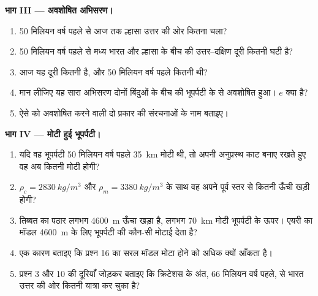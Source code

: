 \begin{problem}[{सप्ताहांत समस्या --- भारत की यात्रा}]
\medskip
\noindent\textbf{भाग III --- अवशोषित अभिसरण।}
\begin{enumerate}[resume]
  \item 50 मिलियन वर्ष पहले से आज तक ल्हासा उत्तर की ओर कितना चला?
  \item 50 मिलियन वर्ष पहले से मध्य भारत और ल्हासा के बीच की
        उत्तर--दक्षिण दूरी कितनी घटी है?
  \item आज यह दूरी कितनी है, और 50 मिलियन वर्ष पहले कितनी थी?
  \item मान लीजिए यह सारा अभिसरण दोनों बिंदुओं के बीच की भूपर्पटी के
         से अवशोषित हुआ।  $e$ क्या है?
  \item ऐसे  को अवशोषित करने वाली दो प्रकार की संरचनाओं के नाम बताइए।
\end{enumerate}

\medskip
\noindent\textbf{भाग IV --- मोटी हुई भूपर्पटी।}
\begin{enumerate}[resume]
  \item यदि वह भूपर्पटी 50 मिलियन वर्ष पहले \qty{35}{km} मोटी थी, तो अपनी
        अनुप्रस्थ काट बनाए रखते हुए वह अब कितनी मोटी होगी?
  \item $\rho_c = \qty{2830}{kg/m^3}$ और $\rho_m = \qty{3380}{kg/m^3}$ के साथ
        वह अपने पूर्व स्तर से कितनी ऊँची खड़ी होगी?
  \item तिब्बत का पठार लगभग \qty{4600}{m} ऊँचा खड़ा है, लगभग
        \qty{70}{km} मोटी भूपर्पटी के ऊपर। एयरी का मॉडल \qty{4600}{m} के लिए
        भूपर्पटी की कौन-सी मोटाई देता है?
  \item एक कारण बताइए कि प्रश्न 16 का सरल मॉडल मोटा होने को
        अधिक क्यों आँकता है।
  \item प्रश्न 3 और 10 की दूरियाँ जोड़कर बताइए कि क्रिटेशस के अंत, 66 मिलियन वर्ष
        पहले, से भारत उत्तर की ओर कितनी
        यात्रा कर चुका है?
\end{enumerate}
\end{problem}
